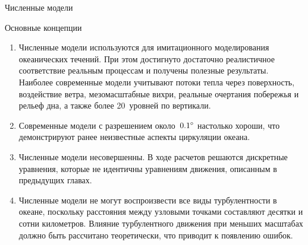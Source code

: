 \begin{chapter}{Численные модели}
\begin{section}{Основные концепции}
\begin{enumerate}
\item 
Численные модели используются для имитационного моделирования океанических
течений. При этом достигнуто достаточно реалистичное соответствие реальным
процессам и получены полезные результаты. Наиболее современные модели
учитывают потоки тепла через поверхность, воздействие
ветра, мезомасштабные вихри, реальные очертания
побережья и рельеф дна, а также более 20~уровней по вертикали.
%

\item
Современные модели с разрешением около~${0.1}^\circ$ настолько хороши,
что демонстрируют ранее неизвестные аспекты циркуляции океана.
%

\item
Численные модели несовершенны. В ходе расчетов решаются дискретные уравнения, 
которые не идентичны уравнениям движения, описанным в предыдущих главах.
%

\item
Численные модели не могут воспроизвести все виды турбулентности%
в океане, поскольку расстояния между узловыми точками составляют десятки и 
сотни километров. Влияние турбулентного движения при меньших масштабах должно
быть рассчитано теоретически, что приводит к появлению ошибок.
%


\end{enumerate}
\end{section}
\end{chapter}
